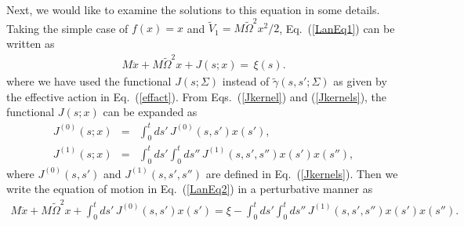 \documentclass[%
amssymb,preprint,preprintnumbers,nofootinbib,superscriptaddress]{revtex4}
\begin{document}
Next, we would like to examine the solutions to this equation in some details. %
Taking the simple case of $f(x)=x$ and $\tilde{V}_{1}=M\tilde{\Omega}^{2}x^{2}/2$, Eq.~(\ref{LanEq1}) can be written as 
\begin{eqnarray}
M\ddot{x}+M\tilde{\Omega}^{2}x+J(s;x)=\,\xi(s).\label{LanEq2}
\end{eqnarray}
where we have used the functional $J(s;\Sigma)$ instead of $\tilde{\gamma}(s,s';\Sigma)$ as given by the effective action in Eq.~(\ref{effact}). From Eqs.~(\ref{Jkernel}) and (\ref{Jkernels}), the functional $J(s;x)$ can be expanded as
\begin{eqnarray}
J^{(0)}(s;x)&=&\int_{0}^{t}ds'\,J^{(0)}(s,s')x(s'),\nonumber\\
J^{(1)}(s;x)&=&\int_{0}^{t}ds'\int_{0}^{t}ds''\,J^{(1)}(s,s',s'')x(s')x(s''),
\end{eqnarray}
where 
$J^{(0)}(s,s')$ and $J^{(1)}(s,s',s'')$ are defined in Eq.~(\ref{Jkernels}).
Then we write the equation of motion in Eq.~(\ref{LanEq2}) in a perturbative manner as
\begin{eqnarray}
M\ddot{x}+M\tilde{\Omega}^{2}x+\int_{0}^{t}ds'\,J^{(0)}(s,s')x(s')=\xi-\int_{0}^{t}ds'\int_{0}^{t}ds''\,J^{(1)}(s,s',s'')x(s')x(s'').\label{LanEq3}
\end{eqnarray}
\end{document}
